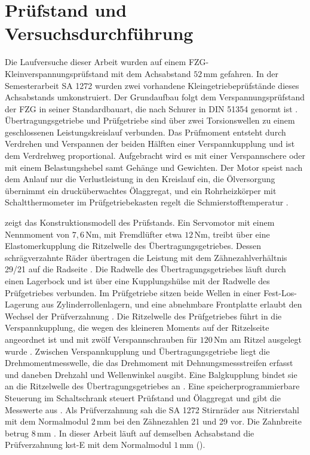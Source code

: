 \section{Prüfstand und Versuchsdurchführung}
\label{sec:pruefstand}

Die Laufversuche dieser Arbeit wurden auf einem FZG-Kleinverspannungsprüfstand mit dem Achsabstand $52$\,mm gefahren. In der Semesterarbeit SA 1272 wurden zwei vorhandene Kleingetriebeprüfstände dieses Achsabstands umkonstruiert. Der Grundaufbau folgt dem Verspannungsprüfstand der FZG in seiner Standardbauart, die nach Schurer in DIN 51354 genormt ist \cite[S.~2 und 8]{Schu09}. Übertragungsgetriebe und Prüfgetriebe sind über zwei Torsionswellen zu einem geschlossenen Leistungskreislauf verbunden. Das Prüfmoment entsteht durch Verdrehen und Verspannen der beiden Hälften einer Verspannkupplung und ist dem Verdrehweg proportional. Aufgebracht wird es mit einer Verspannschere oder mit einem Belastungshebel samt Gehänge und Gewichten. Der Motor speist nach dem Anlauf nur die Verlustleistung in den Kreislauf ein, die Ölversorgung übernimmt ein drucküberwachtes Ölaggregat, und ein Rohrheizkörper mit Schaltthermometer im Prüfgetriebekasten regelt die Schmierstofftemperatur \cite[S.~8]{Schu09}.

 zeigt das Konstruktionsmodell des Prüfstands. Ein Servomotor mit einem Nennmoment von $7{,}6$\,Nm, mit Fremdlüfter etwa $12$\,Nm, treibt über eine Elastomerkupplung die Ritzelwelle des Übertragungsgetriebes. Dessen schrägverzahnte Räder übertragen die Leistung mit dem Zähnezahlverhältnis 29/21 auf die Radseite \cite[S.~9 und 48]{Schu09}. Die Radwelle des Übertragungsgetriebes läuft durch einen Lagerbock und ist über eine Kupplungshülse mit der Radwelle des Prüfgetriebes verbunden. Im Prüfgetriebe sitzen beide Wellen in einer Fest-Los-Lagerung aus Zylinderrollenlagern, und eine abnehmbare Frontplatte erlaubt den Wechsel der Prüfverzahnung \cite[S.~9 und 42]{Schu09}. Die Ritzelwelle des Prüfgetriebes führt in die Verspannkupplung, die wegen des kleineren Moments auf der Ritzelseite angeordnet ist und mit zwölf Verspannschrauben für $120$\,Nm am Ritzel ausgelegt wurde \cite[S.~46]{Schu09}. Zwischen Verspannkupplung und Übertragungsgetriebe liegt die Drehmomentmesswelle, die das Drehmoment mit Dehnungsmessstreifen erfasst und daneben Drehzahl und Wellenwinkel ausgibt. Eine Balgkupplung bindet sie an die Ritzelwelle des Übertragungsgetriebes an \cite[S.~10 und 52]{Schu09}. Eine speicherprogrammierbare Steuerung im Schaltschrank steuert Prüfstand und Ölaggregat und gibt die Messwerte aus \cite[S.~53]{Schu09}. Als Prüfverzahnung sah die SA 1272 Stirnräder aus Nitrierstahl mit dem Normalmodul $2$\,mm bei den Zähnezahlen 21 und 29 vor. Die Zahnbreite betrug $8$\,mm \cite[S.~42]{Schu09}. In dieser Arbeit läuft auf demselben Achsabstand die Prüfverzahnung kst-E mit dem Normalmodul $1$\,mm ().

